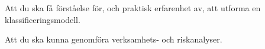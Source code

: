\item Att du ska få förståelse för, och praktisk erfarenhet av, att utforma en 
klassificeringsmodell.
\item Att du ska kunna genomföra verksamhets- och riskanalyser.
